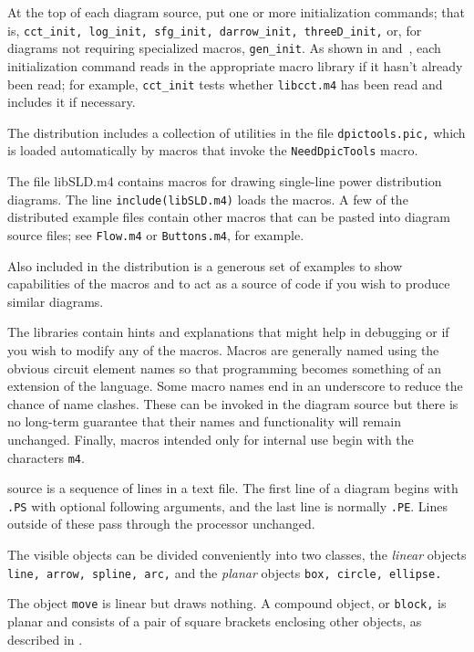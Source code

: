 \pagebreak
At the top of each diagram source, put one or more initialization
commands; that is,
{\tt cct\_init, log\_init, sfg\_init, darrow\_init, threeD\_init,}
or, for diagrams not requiring specialized macros, {\tt gen\_init}.
As shown in  and~,
each initialization command reads in the appropriate macro
library if it hasn't already been read;
for example, {\tt cct\_init} tests whether {\tt libcct.m4} has been
read and includes it if necessary.

The distribution includes a collection of \pic utilities in the file
{\tt dpictools.pic,} which is loaded automatically by macros that
invoke the {\tt NeedDpicTools} macro.

The file libSLD.m4 contains macros for drawing single-line
power distribution diagrams.  The line
{\tt include(libSLD.m4)} loads the macros.
A few of the distributed example files contain other macros
that can be pasted into diagram source files; see
{\tt Flow.m4} or {\tt Buttons.m4}, for example.

Also included in the distribution is a generous set of examples
to show capabilities of the macros and to act as a source of code
if you wish to produce similar diagrams.

The libraries contain hints and explanations that might help in debugging
or if you wish to modify any of the macros.  Macros are generally named
using the obvious circuit element names so that programming becomes something
of an extension of the \pic language.  Some macro names end in an underscore
to reduce the chance of name clashes.  These can be invoked in the
diagram source but there is no long-term guarantee that their names and
functionality
will remain unchanged. Finally, macros intended only for internal use
begin with the characters {\tt m4}.


\Pic source is a sequence of lines in a text file.
The first line of a diagram begins with {\tt .PS} with optional following
arguments, and the last line is normally {\tt .PE}.
Lines outside of these pass through the \pic processor unchanged.

The visible objects can be divided conveniently into two classes, the
{\em linear} objects {\tt line, arrow, spline, arc,} and the
{\em planar} objects {\tt box, circle, ellipse.}

The object {\tt move} is linear but draws nothing.  A compound object,
or {\tt block,} is planar and consists of a pair of square brackets enclosing
other objects, as described in .

